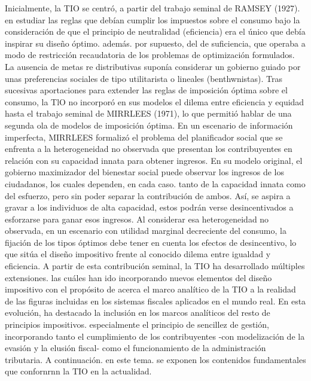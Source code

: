 \documentclass[10pt,a4paper]{article}
\begin{document}
Inicialmente, la TIO se centró, a partir del trabajo seminal de RAMSEY (1927). en estudiar las reglas que debían cumplir los impuestos sobre el consumo bajo la consideración de que el principio de neutralidad (eficiencia) era el único que debía inspirar su diseño óptimo. además. por supuesto, del de suficiencia, que operaba a modo de restricción recaudatoria de los problemas de optimización formulados. La ausencia de metas re distributivas suponía considerar un gobierno guiado por unas preferencias sociales de tipo utilitarista o lineales (benthwnistas). Tras sucesivas aportaciones para extender las reglas de imposición óptima sobre el consumo, la TlO no incorporó en sus modelos el dilema entre eficiencia y equidad hasta el trabajo seminal de MIRRLEES (1971), lo que permitió hablar de una segunda ola de modelos de imposición óptima. En un escenario de información imperfecta, MIRRLEES formalizó el problema del planificador social que se enfrenta a la heterogeneidad no observada que presentan los contribuyentes en relación con su capacidad innata para obtener ingresos. En su modelo original, el gobierno maximizador del bienestar social puede observar los ingresos de los ciudadanos, los cuales dependen, en cada caso. tanto de la capacidad innata como del esfuerzo, pero sin poder separar la contribución de ambos. Así, se aspira a gravar a los individuos de alta capacidad, estos podrán verse desincentivados a esforzarse para ganar esos ingresos. Al considerar esa heterogeneidad no observada, en un escenario con utilidad marginal decreciente del consumo, la fijación de los tipos óptimos debe tener en cuenta los efectos de desincentivo, lo que sitúa el diseño impositivo frente al conocido dilema entre igualdad y eficiencia. A partir de esta contribución seminal, la TIO ha desarrollado múltiples extensiones. las cuáles han ido incorporando nuevos elementos del diseño impositivo con el propósito de acerca el marco analítico de la TIO a la realidad de las figuras incluidas en los sistemas fiscales aplicados en el mundo real. En esta evolución, ha destacado la inclusión en los marcos analíticos del resto de principios impositivos. especialmente el principio de sencillez de gestión, incorporando tanto el cumplimiento de los contribuyentes -con modelización de la evasión y la elusión fiscal- como el funcionamiento de la administración tributaria. A continuación. en este tema. se exponen los contenidos fundamentales que confornrnn la TIO en la actualidad.
\end{document}
